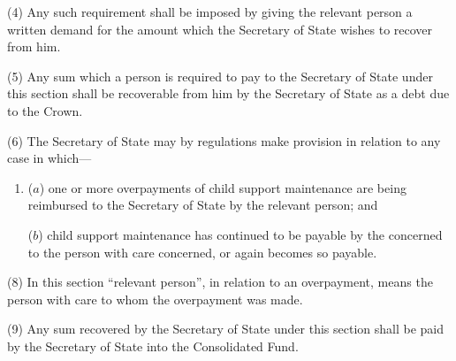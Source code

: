 \documentclass[12pt,a4paper]{article}
\begin{document}
(4)
Any such requirement shall be imposed by giving the relevant person a written demand for the amount which the Secretary of State wishes to recover from him.

(5)
Any sum which a person is required to pay to the Secretary of State under this section shall be recoverable from him by the Secretary of State as a debt due to the Crown.

(6)
The Secretary of State may by regulations make provision in relation to any case in which---
\begin{enumerate}\item[]
($a$) one or more overpayments of child support maintenance are being
reimbursed to the Secretary of State by the relevant person; and

($b$) child support maintenance has continued to be payable by the  concerned to the person with care concerned,
or again becomes so payable.
\end{enumerate}



(8)
In this section “relevant person”, in relation to an overpayment, means the person with care to whom the overpayment was made.

(9)
Any sum recovered by the Secretary of State under this section shall be paid by the Secretary of State into the Consolidated Fund.
\end{document}
